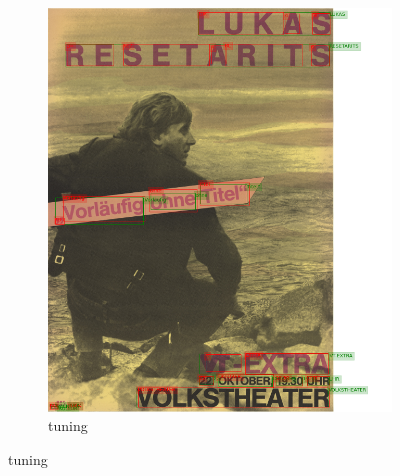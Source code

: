 \begin{figure}[hbtp!]
    \begin{subfigure}{\textwidth}
        \centering
        \includegraphics[scale=0.29]{obrazky/plakaty/result_easyOCR_vienna2_nosplit_tuning-83.png}
        \caption{tuning}
        \label{Im3:ex:easytun}
    \end{subfigure}


\end{figure}
